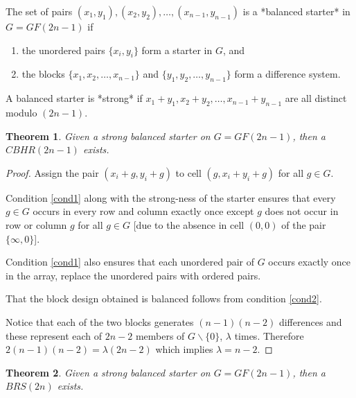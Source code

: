 \documentclass[11pt, a4paper]{book}\usepackage[]{graphicx}\usepackage[]{xcolor}
\newtheorem{theorem}{Theorem}
\begin{document}
The set of pairs
$(x_1, y_1), (x_2, y_2), \ldots, (x_{n - 1}, y_{n - 1})$
is a *balanced starter* in $G = GF(2n - 1)$ if

\begin{enumerate}
  \item{the unordered pairs $\{x_i, y_i\}$ form a starter in
    $G$, and} \label{cond1}
  \item{the blocks $\{x_1, x_2, \ldots, x_{n - 1}\}$ and
    $\{y_1, y_2, \ldots, y_{n - 1}\}$ form a difference system.} \label{cond2}
\end{enumerate}

A balanced starter is *strong* if
$x_1 + y_1, x_2 + y_2, \ldots, x_{n - 1} + y_{n - 1}$ are
all distinct modulo $(2n - 1)$.

\begin{theorem}
Given a strong balanced starter on $G = GF(2n - 1)$, then
a $CBHR(2n - 1)$ exists.
\end{theorem}

\begin{proof}
Assign the pair $(x_i + g, y_i + g)$ to cell
$(g, x_i + y_i + g)$ for all $g \in G$.

Condition \ref{cond1} along with the strong-ness of
the starter ensures that every $g \in G$ occurs in every row
and column exactly once except $g$ does not occur in row or
column $g$ for all $g \in G$ [due to the absence in cell
$(0, 0)$ of the pair $\{\infty, 0\}$].

Condition \ref{cond1} also ensures that each unordered pair of $G$
occurs exactly once in the array, replace the unordered
pairs with ordered pairs.

That the block design obtained is balanced follows
from condition \ref{cond2}.

Notice that each of the two blocks
generates $(n - 1)(n - 2)$ differences and these represent each
of $2n - 2$ members of $G \backslash \{0\}$, $\lambda$ times.
Therefore $2(n - 1)(n - 2) = \lambda (2n - 2)$ which implies
$\lambda = n - 2$.
\end{proof}

\begin{theorem}
Given a strong balanced starter on $G = GF(2n - 1)$, then a
$BRS(2n)$ exists.
\end{theorem}
\end{document}
